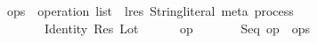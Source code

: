 \isamarkupfalse%
\ ops\ {\isacharcolon}{\isacharcolon}\ {\isachardoublequoteopen}operation\ list\ {\isasymRightarrow}\ {\isacharparenleft}lres{\isacharcomma}\ String{\isachardot}literal{\isacharcomma}\ meta{\isacharparenright}\ process{\isachardoublequoteclose}\isanewline
\ \ \isanewline
\ \ \ \ {\isachardoublequoteopen}\ {\isacharbrackleft}{\isacharbrackright}\ {\isacharequal}\ Identity\ {\isacharparenleft}Res\ Lot{\isacharparenright}{\isachardoublequoteclose}\isanewline
\ \ {\isacharbar}\ {\isachardoublequoteopen}\ {\isacharbrackleft}\ {\isacharequal}\ op\ \isanewline
\ \ {\isacharbar}\ {\isachardoublequoteopen}\ {\isacharparenleft}\ {\isacharequal}\ Seq\ {\isacharparenleft}op\ \ {\isacharparenleft}ops\ 
